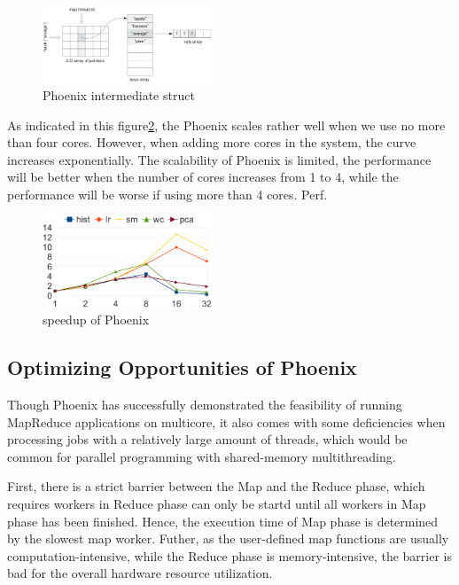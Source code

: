 \begin{figure}[!h!t]  
    \centering
    \includegraphics[width=0.45\textwidth]{eps/phoenix_intermediate.eps}
    \caption{Phoenix intermediate struct}
    \label{fig:phoenix:intermediate}
\end{figure}

As indicated in this figure\ref{fig:phoenix:speedup}, 
the Phoenix scales rather well when we use no more than four cores. 
However, when adding more cores in the system, 
the curve increases exponentially. 
The scalability of Phoenix is limited, the performance will be
better when the number of cores increases from 1 to 4, 
while the performance will be worse if using more than 4 cores. 
Perf\cite{}.


\begin{figure}[!h!t]  
    \centering
    \includegraphics[width=0.45\textwidth]{eps/phoenix_speedup.eps}
    \caption{speedup of Phoenix}
    \label{fig:phoenix:speedup}
\end{figure}


\subsection{Optimizing Opportunities of Phoenix}
Though Phoenix has successfully demonstrated the feasibility
of running MapReduce applications on multicore, 
it also comes with some deficiencies 
when processing jobs with a relatively large
amount of threads, which would be common for parallel programming with shared-memory multithreading.

First, there is a strict barrier between the Map and the Reduce phase, 
which requires workers in Reduce phase can only 
be startd until all workers in Map phase has been finished. 
Hence, the execution time of Map phase is determined by the slowest map worker.
Futher, as the user-defined map functions are usually computation-intensive,
while the Reduce phase is memory-intensive,
the barrier is bad for the overall hardware resource utilization.


